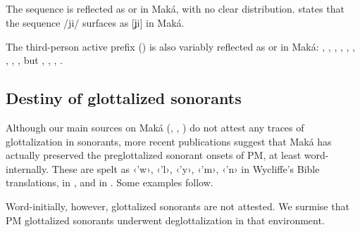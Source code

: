 \subsection{}\label{mk-ji}

The sequence  is reflected as  or  in Maká, with no clear distribution. \citet[36–37]{AG89} states that the sequence /ji/ surfaces as [ʝi] in Maká.

\begin{exe}
    \ex \dew
    \ex \hunger
    \ex \truev
    \ex \ocelot
\end{exe}

The third-person active prefix () is also variably reflected as  or  in Maká: , , , , , , , , , but , , , .

\subsection{Destiny of glottalized sonorants}\label{mk-deglottalization-sonorants}
Although our main sources on Maká (, \citeyear{AG94}, \citeyear{AG99}) do not attest any traces of glottalization in sonorants, more recent publications suggest that Maká has actually preserved the preglottalized sonorant onsets of PM, at least word-internally. These are spelt as ‹'w›, ‹'l›, ‹'y›, ‹'m›, ‹'n› in Wycliffe's Bible translations, in \citet{unuuneiki}, and in \citet{maka-etnomat,PMA}. Some examples follow.

\begin{exe}
    \ex \languagewordpl
    \ex {}
    \ex \smellv
    \ex \hear
    \ex \spousewh
    \ex \marry
    \ex \seev
    \ex \placen
    \ex \rib
\end{exe}

Word-initially, however, glottalized sonorants are not attested. We surmise that PM glottalized sonorants underwent deglottalization in that environment.

\begin{exe}
    \ex \dayworld
    \ex \rhea
    \ex \climb
\end{exe}


